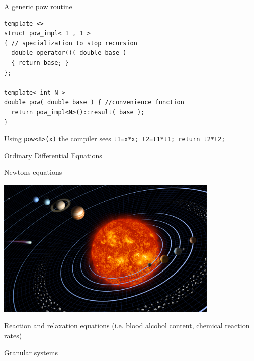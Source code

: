 \documentclass{beamer}
\begin{document}
\begin{frame}[fragile]{A generic pow routine}
\begin{lstlisting}
template <>
struct pow_impl< 1 , 1 >
{ // specialization to stop recursion
  double operator()( double base )
  { return base; }
};

template< int N >
double pow( double base ) { //convenience function
  return pow_impl<N>()::result( base ); 
}
\end{lstlisting}
Using \lstinline+pow<8>(x)+ the compiler sees \lstinline+t1=x*x; t2=t1*t1; return t2*t2;+
\end{frame}

\begin{frame}{Ordinary Differential Equations}
\vspace{.5em}
 \begin{minipage}{0.48\textwidth}
 \begin{center}
  Newtons equations

  \includegraphics[draft=false,width=0.8\textwidth]{solar_system.jpg}
 \end{center}
\end{minipage}
\pause
\begin{minipage}{0.48\textwidth}
 \begin{center}
  Reaction and relaxation equations (i.e. blood alcohol content, chemical reaction rates)
 \end{center}
\end{minipage}
\pause
\vspace{2ex}

\begin{minipage}{0.48\textwidth}
 \begin{center}
  Granular systems


\end{center}
\end{minipage}
\end{frame}
\end{document}
